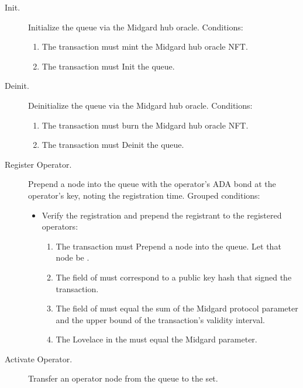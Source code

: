 \documentclass[../midgard.tex]{subfiles}
\begin{document}
\begin{description}
    \item[Init.] Initialize the  queue via the Midgard hub oracle.
      Conditions:
        \begin{enumerate}
            \item The transaction must mint the Midgard hub oracle NFT.
            \item The transaction must Init the  queue.
        \end{enumerate}
    \item[Deinit.] Deinitialize the  queue via the Midgard hub oracle.
      Conditions:
        \begin{enumerate}
            \item The transaction must burn the Midgard hub oracle NFT.
            \item The transaction must Deinit the  queue.
        \end{enumerate}
    \item[Register Operator.] Prepend a node into the  queue with the operator's ADA bond at the operator's key, noting the registration time.
      Grouped conditions:
        \begin{itemize}
            \item Verify the registration and prepend the registrant to the registered operators:
            \begin{enumerate}
                \item The transaction must Prepend a node into the  queue.
                  Let that node be .
                \item The  field of  must correspond to a public key hash that signed the transaction.
                \item The  field of  must equal the sum of the Midgard  protocol parameter and the upper bound of the transaction's validity interval.
                \item The Lovelace in the  must equal the  Midgard parameter.
            \end{enumerate}
        \end{itemize}
    \item[Activate Operator.] Transfer an operator node from the  queue to the  set.

\end{description}
\end{document}
